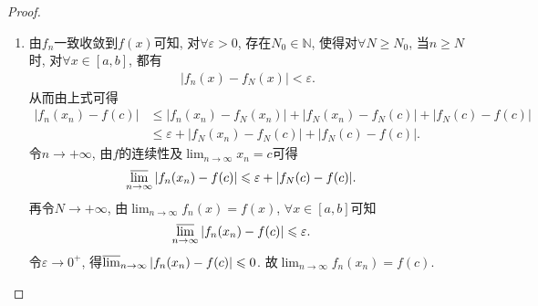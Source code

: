 \documentclass[../../main.tex]{subfiles}
\begin{document}
\begin{proof}
\begin{enumerate}
\item 由\(f_n\)一致收敛到\(f(x)\)可知, 对\(\forall \varepsilon > 0\), 存在\(N_0\in \mathbb{N}\), 使得对\(\forall N\geqslant N_0\), 当\(n\geqslant N\)时, 对\(\forall x\in [a,b]\), 都有
\begin{align*}
|f_n(x) - f_N(x)| < \varepsilon.
\end{align*}
从而由上式可得
\begin{align*}
|f_n(x_n) - f(c)| &\leqslant |f_n(x_n) - f_N(x_n)| + |f_N(x_n) - f_N(c)| + |f_N(c) - f(c)|\\
&\leqslant \varepsilon + |f_N(x_n) - f_N(c)| + |f_N(c) - f(c)|.
\end{align*}
令\(n\rightarrow +\infty\), 由\(f\)的连续性及\(\lim_{n\rightarrow \infty}x_n = c\)可得
\begin{align*}
\varlimsup_{n\rightarrow \infty}|f_n(x_n) - f(c)| &\leqslant \varepsilon + |f_N(c) - f(c)|.
\end{align*}
再令\(N\rightarrow +\infty\), 由\(\lim_{n\rightarrow \infty}f_n(x) = f(x)\), \(\forall x\in [a,b]\)可知
\begin{align*}
\varlimsup_{n\rightarrow \infty}|f_n(x_n) - f(c)| &\leqslant \varepsilon.
\end{align*}
令\(\varepsilon \rightarrow 0^+\), 得\(\varlimsup_{n\rightarrow \infty}|f_n(x_n) - f(c)| \leqslant 0\). 故\(\lim_{n\rightarrow \infty}f_n(x_n) = f(c)\). 


\end{enumerate}
\end{proof}
\end{document}
